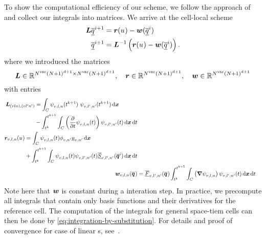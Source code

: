 To show the computational efficiency of our scheme, we follow the approach of~\cite{dumbser2008unified} and collect our integrals into matrices.
We arrive at the cell-local scheme
\begin{align}
  \label{eq:predictor-iterative}
  \pleft \stpredictorCoeff[i+1] &= \prightsol (\ssol) - \prightpred(\stpredictorCoeff[i]) \\
 \stpredictorCoeff[i+1] &= \pleft^{-1} \left( \prightsol (\ssol) - \prightpred(\stpredictorCoeff[i]) \right).
\end{align}
where we introduced the matrices
\begin{equation}
  \label{eq:matrices}
  \bm{L} \in \mathbb{R}^{N^{\text{var}} (N+1)^{d+1} \times N^{\text{var}} (N+1)^{d+1}}, \quad
  \bm{r} \in \mathbb{R}^{N^{\text{var}} (N+1)^{d+1}}, \quad
  \bm{w} \in \mathbb{R}^{N^{\text{var}} (N+1)^{d+1}}
\end{equation}
with entries
\begin{align}
  \label{eq:predictor-matrices}
\begin{split}
  \pleft_{(v l n), (v l' n')} &=
\intdcell{
  \sttestfunction[][v,l,n](\nextTime) \  \stbasis[][v,l',n'](\nextTime)
}
\\&-
\intdt{\intdcell{
  \left( \pdv{}{t} \sttestfunction[][v,l,n] (t) \right) \stbasis[][v,l',n'] (t)
}}
\end{split}
\\
\begin{split}
\prightsol_{v,l,n} (\ssol) &=
\intdcell{
  \sttestfunction[][v,l,n] (t) \sbasis[][v,n'] \ssolCoeff[][v,n']
}
\\&+
\intdt{\intdcell{
  \sttestfunction[][v,l,n] (t) \stbasis[][v,l',n'](t) \stsourceCoeff[][v,l',n'](\stpredictor[i])
}}                             
\end{split}
  \\
\prightpred_{v,l,n} (\stpredictor) &=
\stfluxCoeff[][v,l',n'] (\stpredictor)
\intdt{\intdcell{
  \left( \gradient{\sttestfunction[][v,l,n]} \right) \stbasis[][v,l',n'](t)
}}
\end{align}
Note here that $\bm{w}$ is constant during a interation step.
In practice, we precompute all integrals that contain only basis functions and their derivatives for the reference cell.
The computation of the integrals for general space-tiem cells can then be done by \cref{eq:integration-by-substitution}.
For details and proof of convergence for case of linear \pde{}s, see~\cite{dumbser2008unified}.

